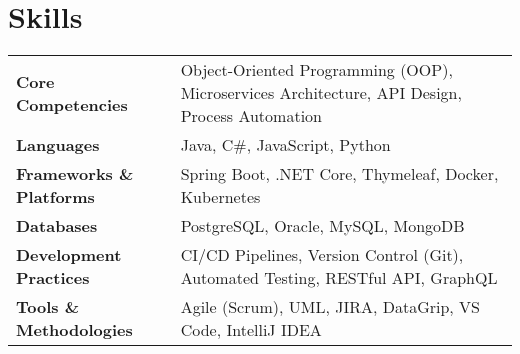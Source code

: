 \section{\textbf{Skills}}

\begin{tabularx}{\linewidth}{@{}l X@{}}
    \textbf{Core Competencies} & Object-Oriented Programming (OOP), Microservices Architecture, API Design, Process Automation \\
    \textbf{Languages} & Java, C\#, JavaScript, Python \\
    \textbf{Frameworks \& Platforms} & Spring Boot, .NET Core, Thymeleaf, Docker, Kubernetes \\
    \textbf{Databases} & PostgreSQL, Oracle, MySQL, MongoDB \\
    \textbf{Development Practices} & CI/CD Pipelines, Version Control (Git), Automated Testing, RESTful API, GraphQL \\
    \textbf{Tools \& Methodologies} & Agile (Scrum), UML, JIRA, DataGrip, VS Code, IntelliJ IDEA \\
\end{tabularx}
